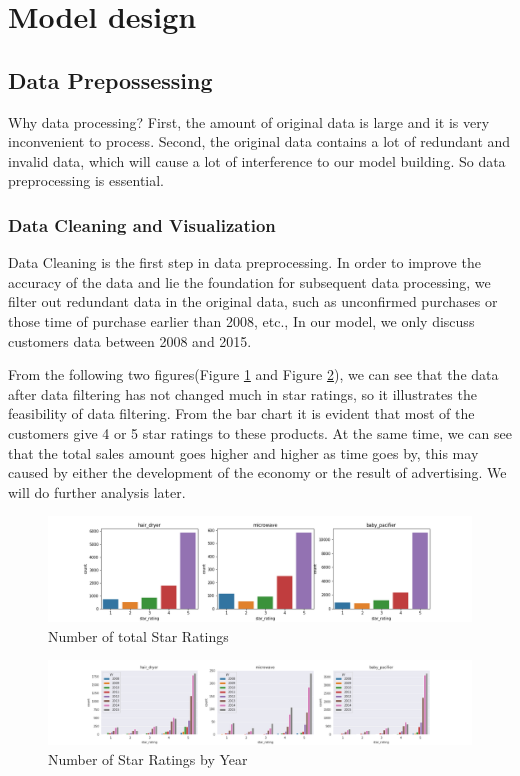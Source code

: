 \documentclass[12pt]{article}  %
\begin{document}
\section{Model design}


\subsection{Data Prepossessing}
Why data processing? First, the amount of original data is large and it is very inconvenient to process. Second, the original data contains a lot of redundant and invalid data, which will cause a lot of interference to our model building. So data preprocessing is essential.

\subsubsection{Data Cleaning and Visualization}
Data Cleaning is the first step in data preprocessing. In order to improve the accuracy of the data and lie the foundation for subsequent data processing, we filter out redundant data in the original data, such as unconfirmed purchases or those time of purchase earlier than 2008, etc., In our model, we only discuss customers data between 2008 and 2015.

From the following two figures(Figure \ref{fig:count rating} and Figure \ref{fig:count rating eight years}), we can see that the data after data filtering has not changed much in star ratings, so it illustrates the feasibility of data filtering. From the bar chart it is evident that most of the customers give 4 or 5 star ratings to these products. At the same time, we can see that the total sales amount goes higher and higher as time goes by, this may caused by either the development of the economy or the result of advertising. We will do further analysis later.

\begin{figure}[!htbp]
\centering
\includegraphics[width=.8\textwidth]{count_rating.png}
\caption{Number of total Star Ratings}\label{fig:count rating}
\end{figure}

\begin{figure}[!htbp]
\centering
\includegraphics[width=.8\textwidth]{count_rating_8year.png}
\caption{Number of Star Ratings by Year}\label{fig:count rating eight years}
\end{figure}
\end{document}
